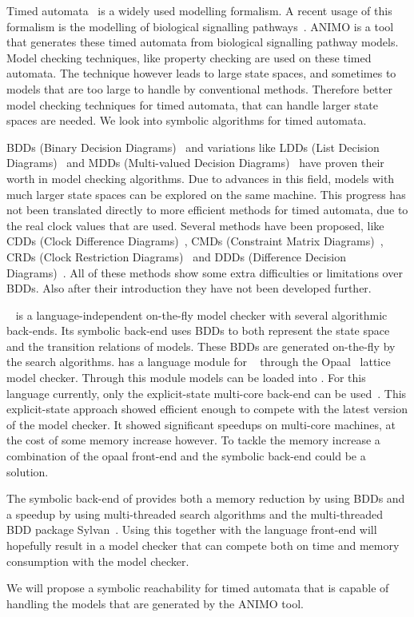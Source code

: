 Timed automata~\cite{Alur1994183} is a widely used modelling formalism. A recent usage of this formalism is the modelling of biological signalling pathways~\cite{SchivoSWCVKLPP12}. ANIMO is a tool that generates these timed automata from biological signalling pathway models. Model checking techniques, like property checking are used on these timed automata. The technique however leads to large state spaces, and sometimes to models that are too large to handle by conventional methods. Therefore better model checking techniques for timed automata, that can handle larger state spaces are needed. We look into symbolic algorithms for timed automata.

BDDs (Binary Decision Diagrams)~\cite{Akers:1978:BDD:1310167.1310815,1676819} and variations like LDDs (List Decision Diagrams)~\cite{so62465} and MDDs (Multi-valued Decision Diagrams)~\cite{129849} have proven their worth in model checking algorithms. Due to advances in this field, models with much larger state spaces can be explored on the same machine. This progress has not been translated directly to more efficient methods for timed automata, due to the real clock values that are used. Several methods have been proposed, like CDDs (Clock Difference Diagrams)~\cite{BRICS19491}, CMDs (Constraint Matrix Diagrams)~\cite{5702245}, CRDs (Clock Restriction Diagrams)~\cite{crds} and DDDs (Difference Decision Diagrams)~\cite{ddds, ddd-datastructure-99}. All of these methods show some extra difficulties or limitations over BDDs. Also after their introduction they have not been developed further.

\ltsmin{}~\cite{eemcs18152,ltsmin-mc:nmf2011} is a language-independent on-the-fly model checker with several algorithmic back-ends. Its symbolic back-end uses BDDs to both represent the state space and the transition relations of models. These BDDs are generated on-the-fly by the search algorithms. \ltsmin{} has a language module for \uppaal{}~\cite{UPPAAL} through the Opaal~\cite{opaal} lattice model checker. Through this module \uppaal{} models can be loaded into \ltsmin{}. For this language currently, only the explicit-state multi-core back-end can be used~\cite{eemcs21972}. This explicit-state approach showed efficient enough to compete with the latest version of the \uppaal{} model checker. It showed significant speedups on multi-core machines, at the cost of some memory increase however. To tackle the memory increase a combination of the opaal front-end and the symbolic back-end could be a solution.

The symbolic back-end of \ltsmin{} provides both a memory reduction by using BDDs and a speedup by using multi-threaded search algorithms and the multi-threaded BDD package Sylvan~\cite{sylvan}. Using this together with the \uppaal{} language front-end will hopefully result in a model checker that can compete both on time and memory consumption with the \uppaal{} model checker.

We will propose a symbolic reachability for timed automata that is capable of handling the models that are generated by the ANIMO tool.